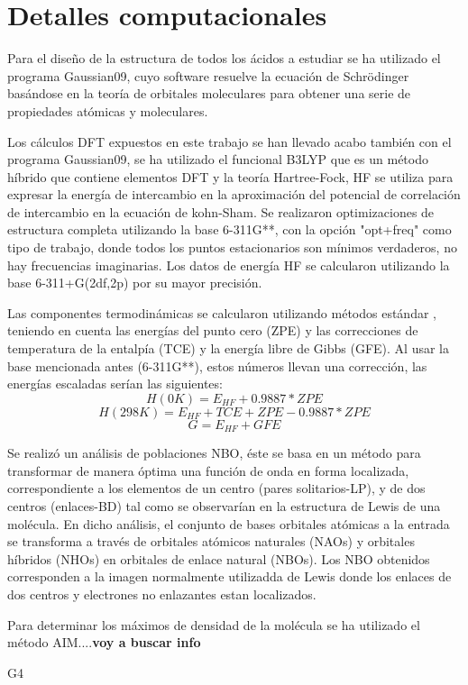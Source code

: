 \chapter{Detalles computacionales}

Para el diseño de la estructura de todos los ácidos a estudiar se ha utilizado el programa Gaussian09, cuyo software resuelve la ecuación de Schrödinger basándose en la teoría de orbitales moleculares para obtener una serie de propiedades atómicas y moleculares.

Los cálculos DFT expuestos en este trabajo se han llevado acabo también con el programa Gaussian09, se ha utilizado el funcional B3LYP que es un método híbrido que contiene elementos DFT y la teoría Hartree-Fock, HF se utiliza para expresar la energía de intercambio en la aproximación del potencial de correlación de intercambio en la ecuación de kohn-Sham. Se realizaron optimizaciones de estructura completa utilizando la base 6-311G**, con la opción "opt+freq" como tipo de trabajo, donde todos los puntos estacionarios son mínimos verdaderos, no hay frecuencias imaginarias. Los datos de energía HF se calcularon utilizando la base 6-311+G(2df,2p) por su mayor precisión.

Las componentes termodinámicas se calcularon utilizando métodos estándar \cite {quimica4}, teniendo en cuenta las energías del punto cero (ZPE) y las correcciones de temperatura de la entalpía (TCE) y la energía libre de Gibbs (GFE). Al usar la base mencionada antes (6-311G**), estos números llevan una corrección, las energías escaladas serían las siguientes: \\
$$ H (0K) = E_{HF} + 0.9887*ZPE $$ 
$$ H (298K) = E_{HF} + TCE + ZPE - 0.9887*ZPE $$ 
$$G = E_{HF} + GFE $$

Se realizó un análisis de poblaciones NBO, éste se basa en un método para transformar de manera óptima una función de onda en forma localizada, correspondiente a los elementos de un centro (pares solitarios-LP), y de dos centros (enlaces-BD) tal como se observarían en la estructura de Lewis de una molécula. En dicho análisis, el conjunto de bases orbitales atómicas a la entrada se transforma a través de orbitales atómicos naturales (NAOs) y orbitales híbridos (NHOs) en orbitales de enlace natural (NBOs). Los NBO obtenidos corresponden a la imagen normalmente utilizadda de Lewis donde los enlaces de dos centros y electrones no enlazantes estan localizados.

Para determinar los máximos de densidad de la molécula se ha utilizado el método AIM....{\bfseries voy a buscar info}

G4
